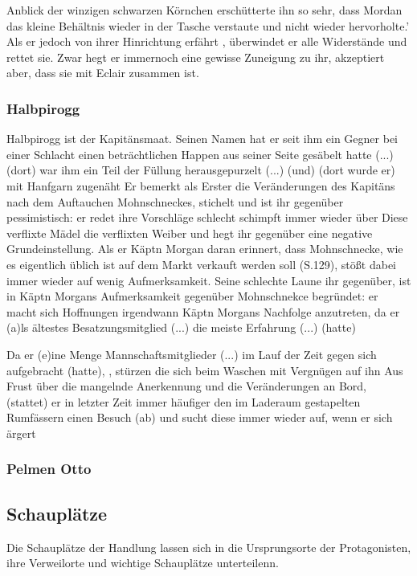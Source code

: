 Anblick der winzigen schwarzen Körnchen erschütterte ihn so sehr, dass Mordan das kleine Behältnis wieder in der Tasche verstaute und nicht wieder hervorholte.'\cite[S.531]{pir} Als er jedoch von ihrer Hinrichtung erfährt , überwindet er alle Widerstände und rettet sie. \cite[S.620]{pir} Zwar hegt er immernoch eine gewisse Zuneigung zu ihr, akzeptiert aber, dass sie mit Eclair zusammen ist. \cite[S.632f]{pir}

\subsubsection{Halbpirogg}
Halbpirogg ist der Kapitänsmaat. Seinen Namen hat er seit ihm ein Gegner bei einer Schlacht 
einen beträchtlichen Happen aus seiner Seite gesäbelt hatte (...)(dort) 
war ihm ein Teil der Füllung herausgepurzelt (...) 
(und) (dort wurde er) mit Hanfgarn zugenäht\cite[S. 33]{pir}
Er bemerkt als Erster die Veränderungen des Kapitäns nach 
dem Auftauchen Mohnschneckes, stichelt und ist ihr gegenüber pessimistisch:
er redet ihre Vorschläge schlecht \cite[S. 266]{pir} schimpft immer wieder über Diese verflixte Mädel\cite[S. 145]{pir}
die verflixten Weiber \cite[302]{pir}und 
hegt ihr gegenüber eine negative Grundeinstellung. \cite[S. 297]{pir}
Als er Käptn Morgan daran erinnert, dass Mohnschnecke, wie es eigentlich üblich ist \cite[S.50]{pir} 
auf dem Markt verkauft werden soll (S.129), stößt dabei immer wieder auf wenig Aufmerksamkeit. \cite[S. 145]{pir}
Seine schlechte Laune ihr gegenüber, ist in Käptn Morgans Aufmerksamkeit gegenüber Mohnschnekce begründet: er macht
sich Hoffnungen irgendwann Käptn Morgans Nachfolge anzutreten, 
da er (a)ls ältestes Besatzungsmitglied (...) die meiste Erfahrung (...) (hatte)\cite[S.371]{pir}
 
Da er (e)ine Menge Mannschaftsmitglieder  (...) im Lauf der Zeit gegen sich aufgebracht (hatte), \cite[S.151]{pir}, 
stürzen die sich beim Waschen mit Vergnügen auf ihn \cite[S.151]{pir}
Aus Frust über die mangelnde Anerkennung und die Veränderungen an Bord, 
(stattet) er in letzter Zeit immer häufiger den im Laderaum gestapelten Rumfässern 
einen Besuch (ab) \cite[S. 181]{pir} und sucht diese immer wieder auf, wenn er sich ärgert \cite[S. 303]{pir}


\subsubsection{Pelmen Otto}


\subsection{Schauplätze}
Die Schauplätze der Handlung lassen sich in die Ursprungsorte der Protagonisten, ihre Verweilorte und wichtige Schauplätze unterteilenn.

